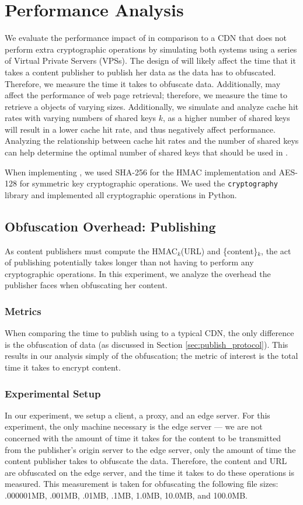 \section{Performance Analysis}
\label{sec:performance}

We evaluate the performance impact of \system{} in comparison to a CDN that does not perform extra cryptographic operations by simulating both systems 
using a series of Virtual Private Servers (VPSs).  The design of \system{} will likely affect the time that it takes a content publisher to publish her data as
the data has to obfuscated.  Therefore, we measure the time it takes to obfuscate data.  Additionally, \system{} may affect the performance of web page retrieval; therefore, we measure the time to retrieve a objects of varying sizes.  Additionally, we simulate and analyze cache hit rates with varying numbers of 
shared keys $k$, as a higher number of shared keys will result in a lower cache hit rate, and thus negatively affect performance. Analyzing the relationship between cache hit
rates and the number of shared keys can help determine the optimal number of shared keys that should be used in \system{}.

When implementing \system{}, we used SHA-256 for the HMAC implementation and AES-128 for symmetric key cryptographic operations.  We used the {\tt cryptography} library and implemented 
all cryptographic operations in Python.  

\subsection{Obfuscation Overhead: Publishing}
As content publishers must compute the HMAC$_k$(URL) and \{content\}$_k$, the act of publishing potentially 
takes longer than not having to perform any cryptographic operations.  In this experiment, we analyze the overhead 
the publisher faces when obfuscating her content.

\subsubsection{Metrics}
When comparing the time to publish using \system{} to a typical CDN, the only difference is the obfuscation of 
data (as discussed in Section \ref{sec:publish_protocol}).  This results in our analysis simply of the 
obfuscation; the metric of interest is the total time it takes to encrypt content.  

\subsubsection{Experimental Setup}
In our experiment, we setup a client, a proxy, and an edge server. For this experiment, the only machine necessary is 
the edge server --- we are not concerned with the amount of time it takes for the content to be transmitted from 
the publisher's origin server to the edge server, only the amount of time the content publisher takes to obfuscate the data.  Therefore, 
the content and URL are obfuscated on the edge server, and the time it takes to do these operations is measured.  This 
measurement is taken for obfuscating the following file sizes: .000001MB, .001MB, .01MB, .1MB, 1.0MB, 10.0MB, and 100.0MB.

